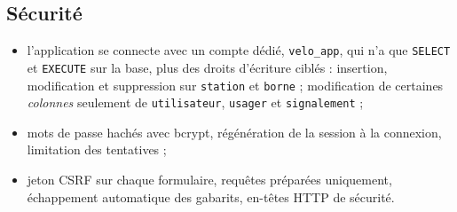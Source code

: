 \subsection{Sécurité}

\begin{itemize}
	\item l'application se connecte avec un compte dédié, \texttt{velo\_app}, qui n'a que \texttt{SELECT} et \texttt{EXECUTE} sur la base, plus des droits d'écriture ciblés : insertion, modification et suppression sur \texttt{station} et \texttt{borne} ; modification de certaines \emph{colonnes} seulement de \texttt{utilisateur}, \texttt{usager} et \texttt{signalement} ;
	\item mots de passe hachés avec bcrypt, régénération de la session à la connexion, limitation des tentatives ;
	\item jeton CSRF sur chaque formulaire, requêtes préparées uniquement, échappement automatique des gabarits, en-têtes HTTP de sécurité.
\end{itemize}
